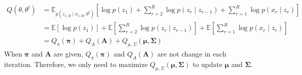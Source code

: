 \documentclass[12pt]{article}
\newenvironment{problem}[2][Problem]{\begin{trivlist}
\item[\hskip \labelsep {\bfseries #1}\hskip \labelsep {\bfseries #2.}]}{\end{trivlist}}
\begin{document}
\begin{problem}{2.6.18}
\begin{align*}
    Q(\theta, \theta^{t}) &= 
    \mathbb{E}_{p(z_{1:R}\mid x_{1:R}, \theta^{t})}[
        \log p(z_1) + \sum_{r=2}^{R} \log p(z_r \mid z_{r-1}) 
        + \sum_{r=1}^{R} \log p(x_r\mid z_r)] \\
    &= \mathbb{E}[\log p(z_1)] 
        + \mathbb{E}[\sum_{r=2}^{R} \log p(z_r \mid z_{r-1})] 
        + \mathbb{E}[\sum_{r=1}^{R} \log p(x_r\mid z_r)] \\
    &= Q_{\pi}(\bm{\pi}) + Q_{A}(\bm{A}) + Q_{\mu, \Sigma}(\bm{\mu}, \bm{\Sigma})
\end{align*}
When $\bm{\pi}$ and $\bm{A}$ are given, $Q_{\pi}(\bm{\pi})$ and $Q_{A}(\bm{A})$ 
are not change in each iteration. Therefore, we only need to maximize 
$Q_{\mu, \Sigma}(\bm{\mu}, \bm{\Sigma})$ to update $\bm{\mu}$ and $\bm{\Sigma}$.
\end{problem}
\pagebreak
\end{document}
